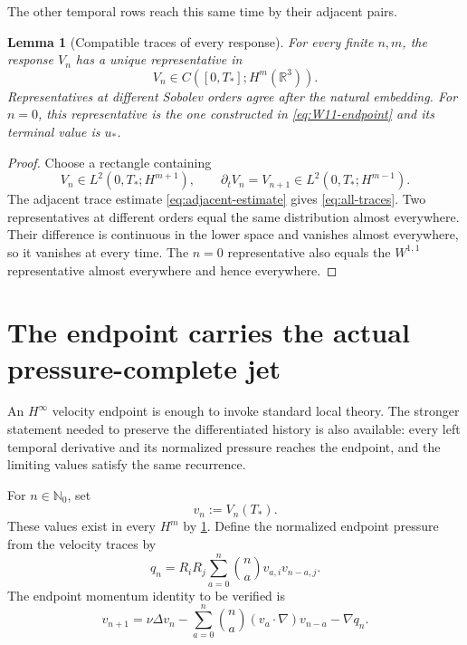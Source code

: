 \documentclass[11pt]{article}
\newtheorem{lemma}[lemma]{Lemma}
\theoremstyle{definition}
\theoremstyle{remark}
\newcommand{\R}{\mathbb R}
\newcommand{\Nzero}{\mathbb N_0}
\begin{document}
The other temporal rows reach this same time by their adjacent pairs.

\medskip
\begin{lemma}[Compatible traces of every response]
\label{lem:all-traces}
For every finite \(n,m\), the response \(V_n\) has a unique representative in
\begin{equation}
 V_n\in C([0,T_*];H^m(\R^3)).
 \label{eq:all-traces}
\end{equation}
Representatives at different Sobolev orders agree after the natural embedding.
For \(n=0\), this representative is the one constructed in
\eqref{eq:W11-endpoint} and its terminal value is \(u_*\).
\end{lemma}

\begin{proof}
Choose a rectangle containing
\[
 V_n\in L^2(0,T_*;H^{m+1}),
 \qquad
 \partial_tV_n=V_{n+1}\in L^2(0,T_*;H^{m-1}).
\]
The adjacent trace estimate \eqref{eq:adjacent-estimate} gives
\eqref{eq:all-traces}.  Two representatives at different orders equal the
same distribution almost everywhere.  Their difference is continuous in the
lower space and vanishes almost everywhere, so it vanishes at every time.
The \(n=0\) representative also equals the \(W^{1,1}\) representative almost
everywhere and hence everywhere.
\end{proof}

\section{The endpoint carries the actual pressure-complete jet}
\label{sec:endpoint-jet}

An \(H^\infty\) velocity endpoint is enough to invoke standard local theory.
The stronger statement needed to preserve the differentiated history is also
available: every left temporal derivative and its normalized pressure reaches
the endpoint, and the limiting values satisfy the same recurrence.

For \(n\in\Nzero\), set
\[
 v_n:=V_n(T_*).
\]
These values exist in every \(H^m\) by \cref{lem:all-traces}.  Define the
normalized endpoint pressure from the velocity traces by
\begin{equation}
 q_n
 =R_iR_j\sum_{a=0}^{n}\binom na v_{a,i}v_{n-a,j}.
 \label{eq:endpoint-pressure}
\end{equation}
The endpoint momentum identity to be verified is
\begin{equation}
 v_{n+1}
 =\nu\Delta v_n
 -\sum_{a=0}^{n}\binom na(v_a\cdot\nabla)v_{n-a}
 -\nabla q_n.
 \label{eq:endpoint-velocity}
\end{equation}
\end{document}
